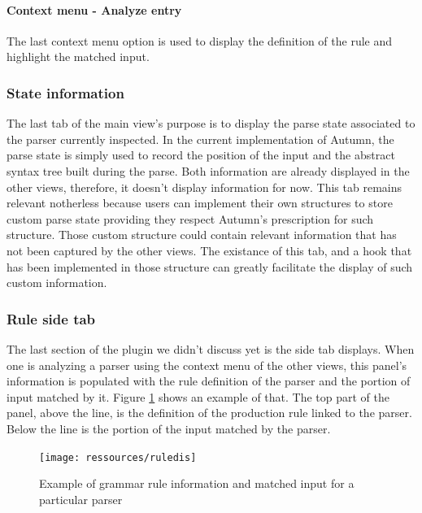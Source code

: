 	\paragraph{Context menu - Analyze entry} The last context menu option is used to display the definition of the rule and highlight the matched input. 

	\subsubsection{State information} The last tab of the main view's purpose is to display the parse state associated to the parser currently inspected. In the current implementation of Autumn, the parse state is simply used to record the position of the input and the abstract syntax tree built during the parse. Both information are already displayed in the other views, therefore, it doesn't display information for now. This tab remains relevant notherless because users can implement their own structures to store custom parse state providing they respect Autumn's prescription for such structure. Those custom structure could contain relevant information that has not been captured by the other views. The existance of this tab, and a hook that has been implemented in those structure can greatly facilitate the display of such custom information.

	\subsubsection{Rule side tab} 

	The last section of the plugin we didn't discuss yet is the side tab displays. When one is analyzing a parser using the context menu of the other views, this panel's information is populated with the rule definition of the parser and the portion of input matched by it. Figure \ref{fig:ruledis} shows an example of that.
	The top part of the panel, above the line, is the definition of the production rule linked to the parser. Below the line is the portion of the input matched by the parser.

	\begin{figure}[h]
		\texttt{[image: ressources/ruledis]}
		\caption{Example of grammar rule information and matched input for a particular parser} 
		\label{fig:ruledis}
	\end{figure}

